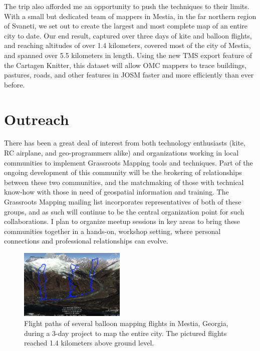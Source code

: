 \documentclass[11pt,oneside,notitlepage]{report}
\begin{document}
{{The trip also afforded me an opportunity to push the techniques to their limits. With a small but dedicated team of mappers in Mestia, in the far northern region of Svaneti, we set out to create the largest and most complete map of an entire city to date. Our end result, captured over three days of kite and balloon flights, and reaching altitudes of over 1.4 kilometers, covered most of the city of Mestia, and spanned over 5.5 kilometers in length. Using the new \ac{TMS} export feature of the Cartagen Knitter, this dataset will allow \ac{OMC} mappers to trace buildings, pastures, roads, and other features in \ac{JOSM} faster and more efficiently than ever before. 

\section{Outreach}

There has been a great deal of interest from both technology enthusiasts (kite, RC airplane, and geo-programmers alike) and organizations working in local communities to implement Grassroots Mapping tools and techniques. Part of the ongoing development of this community will be the brokering of relationships between these two communities, and the matchmaking of those with technical know-how with those in need of geospatial information and training. The Grassroots Mapping mailing list incorporates representatives of both of these groups, and as such will continue to be the central organization point for such collaborations. I plan to organize meetup sessions in key areas to bring these communities together in a hands-on, workshop setting, where personal connections and professional relationships can evolve.

\begin{figure}
	\begin{flushright}
		\includegraphics[width=0.45\textwidth]{images/mestia-gps.png}
		\caption{Flight paths of several balloon mapping flights in Mestia, Georgia, during a 3-day project to map the entire city. The pictured flights reached 1.4 kilometers above ground level.}
	\end{flushright}
\end{figure}

}}
\end{document}
